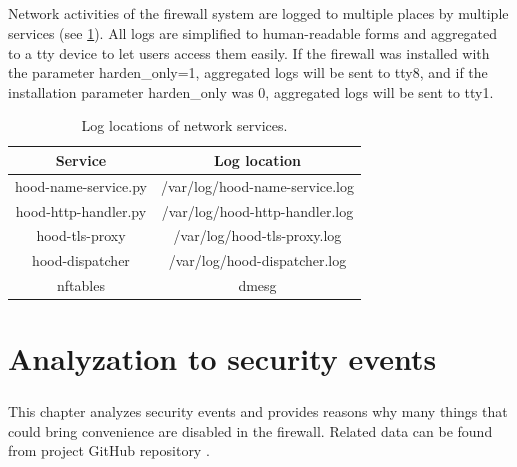 \documentclass[mscthesis]{usiinfthesis}
\begin{document}
\paragraph{}
Network activities of the firewall system are logged to multiple places by multiple services (see \cref{tab:network_log}). All logs are simplified to human-readable forms and aggregated to a tty device to let users access them easily. If the firewall was installed with the parameter harden\_only=1, aggregated logs will be sent to tty8, and if the installation parameter harden\_only was 0, aggregated logs will be sent to tty1.
\begin{table}[H]
  \centering
  \begin{tabular}{|c|c|}
    \hline
    Service              & Log location                   \\
    \hline
    hood-name-service.py & /var/log/hood-name-service.log \\
    hood-http-handler.py & /var/log/hood-http-handler.log \\
    hood-tls-proxy       & /var/log/hood-tls-proxy.log    \\
    hood-dispatcher      & /var/log/hood-dispatcher.log   \\
    nftables             & dmesg                          \\
    \hline
  \end{tabular}
  \caption{Log locations of network services.}
  \label{tab:network_log}
\end{table}



\chapter{Analyzation to security events}
\paragraph{}
This chapter analyzes security events and provides reasons why many things that could bring convenience are disabled in the firewall. Related data can be found from project GitHub repository \citep{hood:github}.
\end{document}
